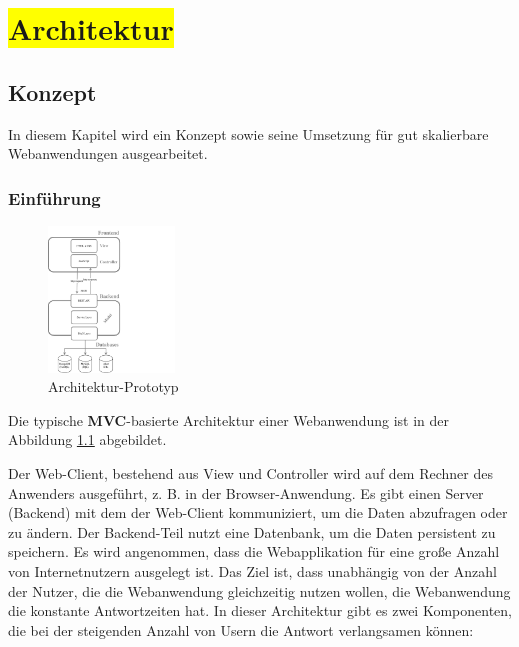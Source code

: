 \chapter{\colorbox{yellow}{Architektur}}

\section{Konzept}
In diesem Kapitel wird ein Konzept sowie seine Umsetzung für gut skalierbare Webanwendungen ausgearbeitet.

\subsection{Einführung}

\begin{figure}
\begin{center}
\vspace{-35pt}%
\includegraphics[trim = 0mm 0mm 0mm 0mm, clip, width=0.3\textwidth]{resources/architectureMyAppWithoutFrameworks}
\caption[Architektur-Prototyp]{Architektur-Prototyp}
\label{img:architectureMyApp}
\vspace{-35pt}%
\end{center}
\end{figure}
Die typische \textbf{MVC}-basierte Architektur einer Webanwendung ist in der Abbildung \ref{img:architectureMyApp} abgebildet.

Der Web-Client, bestehend aus View und Controller wird auf dem Rechner des Anwenders ausgeführt, z. B. in der Browser-Anwendung. Es gibt einen Server (Backend) mit dem der Web-Client kommuniziert, um die Daten abzufragen oder zu ändern. Der Backend-Teil nutzt eine Datenbank, um die Daten persistent zu speichern. Es wird angenommen, dass die Webapplikation für eine große Anzahl von Internetnutzern ausgelegt ist. Das Ziel ist, dass unabhängig von der Anzahl der Nutzer, die die Webanwendung gleichzeitig nutzen wollen, die Webanwendung die konstante Antwortzeiten hat. In dieser Architektur gibt es zwei Komponenten, die bei der steigenden Anzahl von Usern die Antwort verlangsamen können:

